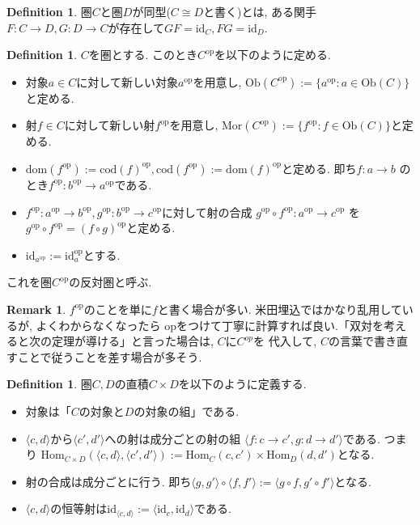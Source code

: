 \documentclass[a4paper,10pt]{article}
\theoremstyle{definition}
\newtheorem{definition}[thm]{\bfseries Definition}
\newtheorem{remark}[thm]{\bfseries Remark}    %
\begin{document}
\begin{definition}
    圏$C$と圏$D$が同型($C \cong D$と書く)とは, ある関手$F: C \rightarrow D,
    G: D \rightarrow C$が存在して$GF= \mathrm{\mathrm{id}}_C, FG=\mathrm{id}_D$.
\end{definition}
\begin{definition}
    $C$を圏とする. このとき$C^{\mathrm{op}}$を以下のように定める.
    \begin{itemize}
        \item 対象$a \in C$に対して新しい対象$a^{\mathrm{op}}$を用意し, $\mathrm{Ob}(C^{\mathrm{op}})
        := \{a^{\mathrm{op}}:a \in \mathrm{Ob}(C)\}$と定める. 
        \item 射$f \in C$に対して新しい射$f^{\mathrm{op}}$を用意し, $\mathrm{Mor}(C^{\mathrm{op}})
        := \{f^{\mathrm{op}}:f \in \mathrm{Ob}(C)\}$と定める. 
        \item $\mathrm{dom}(f^{\mathrm{op}}):=\mathrm{cod}(f)^{\mathrm{op}}, 
        \mathrm{cod}(f^{\mathrm{op}}):=\mathrm{dom}(f)^{\mathrm{op}}$と定める. 即ち$f:a \rightarrow b$
        のとき$f^{\mathrm{op}}: b^{\mathrm{op}} \rightarrow a^{\mathrm{op}}$である.
        \item $f^{\mathrm{op}}:a^{\mathrm{op}} \rightarrow b^{\mathrm{op}}, g^{\mathrm{op}}
        : b^{\mathrm{op}} \rightarrow c^{\mathrm{op}}$に対して射の合成
        $g^{\mathrm{op}}\circ f^{\mathrm{op}}: a^{\mathrm{op}} \rightarrow c^{\mathrm{op}}$
        を $g^{\mathrm{op}}\circ f^{\mathrm{op}}=(f \circ g)^{\mathrm{op}}$と定める.
        \item $\mathrm{id}_{a^{\mathrm{op}}}:= \mathrm{id}_a^{\mathrm{op}}$とする.
    \end{itemize}
    これを圏$C^{\mathrm{op}}$の反対圏と呼ぶ.
\end{definition}
\begin{remark}
    $f^{\textrm{op}}$のことを単に$f$と書く場合が多い. 米田埋込ではかなり乱用しているが, よくわからなくなったら
    $\textrm{op}$をつけて丁寧に計算すれば良い.「双対を考えると次の定理が導ける」と言った場合は, $CにC^{op}$を
    代入して, $C$の言葉で書き直すことで従うことを差す場合が多そう.
\end{remark}
\begin{definition}
    圏$C, D$の直積$C \times D$を以下のように定義する.
    \begin{itemize}
        \item 対象は「$C$の対象と$D$の対象の組」である.
        \item $\langle c,d \rangle$から$\langle c',d' \rangle$への射は成分ごとの射の組
        $\langle f:c \rightarrow c', g: d \rightarrow d' \rangle$である. つまり
        $\textrm{Hom}_{C \times D}(\langle c,d \rangle, \langle c',d' \rangle):=
        \textrm{Hom}_C(c,c') \times \textrm{Hom}_D(d,d')$となる.
        \item 射の合成は成分ごとに行う. 即ち$\langle g, g' \rangle \circ \langle f,f' \rangle
        :=\langle g \circ f, g' \circ f'\rangle$となる.
        \item $\langle c,d \rangle$の恒等射は$\textrm{id}_{\langle c,d \rangle}:=
        \langle \textrm{id}_{c}, \textrm{id}_d \rangle$である.
    \end{itemize}
\end{definition}
\end{document}

